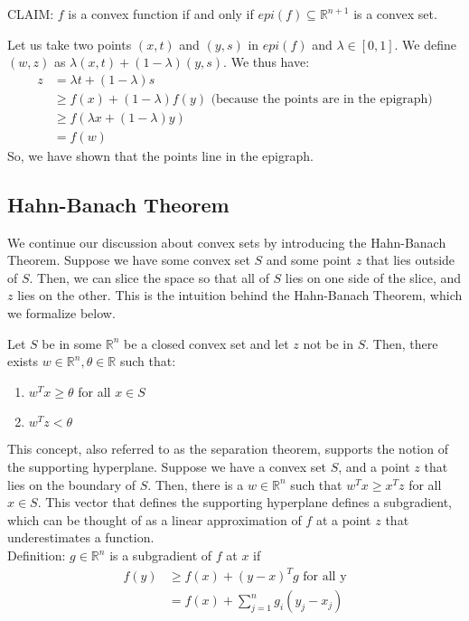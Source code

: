 \documentclass[11pt]{article}
\begin{document}
CLAIM: $f$ is a convex function if and only if $epi(f) \subseteq \mathbb{R}^{n+1}$ is a convex set.

Let us take two points $(x, t)$ and $(y, s)$ in $epi(f)$ and $\lambda \in [0, 1]$.  We define $(w, z)$ as $\lambda(x, t) + (1-\lambda)(y, s)$.  We thus have:\\
\begin{align*}
z &= \lambda t + (1-\lambda)s\\
&\geq f(x) + (1-\lambda)f(y) \text{ (because the points are in the epigraph)}\\
& \geq f(\lambda x + (1-\lambda)y)\\
&= f(w)
\end{align*}
So, we have shown that the points line in the epigraph.


\subsection{Hahn-Banach Theorem}

We continue our discussion about convex sets by introducing the Hahn-Banach Theorem.  Suppose we have some convex set $S$ and some point $z$ that lies outside of $S$.  Then, we can slice the space so that all of $S$ lies on one side of the slice, and $z$ lies on the other.  This is the intuition behind the Hahn-Banach Theorem, which we formalize below.
\begin{theorem}
	Let $S$ be in some $\mathbb{R}^{n}$ be a closed convex set and let $z$ not be in $S$.  Then, there exists $w \in \mathbb{R}^{n}, \theta \in \mathbb{R}$ such that:
\begin{enumerate}
\item $w^{T}x \geq \theta$ for all $x \in S$
\item $w^{T}z < \theta$
\end{enumerate}
\end{theorem}

This concept, also referred to as the separation theorem, supports the notion of the supporting hyperplane.  Suppose we have a convex set $S$, and a point $z$ that lies on the boundary of $S$.  Then, there is a $w \in \mathbb{R}^{n}$ such that $w^{T}x \geq x^{T}z$ for all $x \in S$.  This vector that defines the supporting hyperplane defines a subgradient, which can be thought of as a linear approximation of $f$ at a point $z$ that underestimates a function.\\
Definition: $g \in \mathbb{R}^{n}$ is a subgradient of $f$ at $x$ if
\begin{align*}
f(y) &\geq f(x) + (y- x)^{T}g \text{ for all y}\\
&= f(x) + \sum_{j=1} ^{n} g_{i}(y_{j}-x_{j})
\end{align*}
\end{document}
